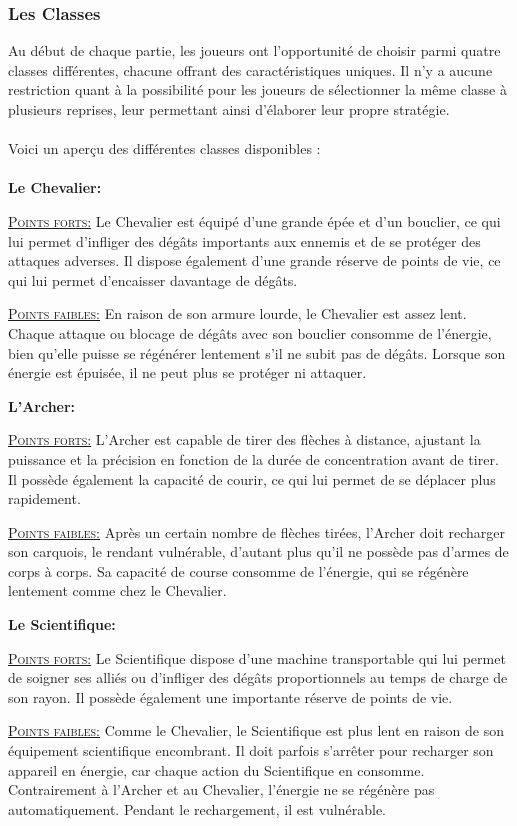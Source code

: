 \documentclass{article}
\begin{document}
\subsubsection{Les Classes}
Au début de chaque partie, les joueurs ont l'opportunité de choisir parmi quatre classes différentes, chacune offrant des caractéristiques uniques. Il n'y a aucune restriction quant à la possibilité pour les joueurs de sélectionner la même classe à plusieurs reprises, leur permettant ainsi d'élaborer leur propre stratégie.\\ \\
Voici un aperçu des différentes classes disponibles :\\ \\
\textbf{Le Chevalier:}
\begin{list}{}{\leftmargin 1cm} 
\item \textsc{\underline{Points forts:}}
Le Chevalier est équipé d'une grande épée et d'un bouclier, ce qui lui permet d'infliger des dégâts importants aux ennemis et de se protéger des attaques adverses. Il dispose également d'une grande réserve de points de vie, ce qui lui permet d'encaisser davantage de dégâts.
\item \textsc{\underline{Points faibles:}}
En raison de son armure lourde, le Chevalier est assez lent. Chaque attaque ou blocage de dégâts avec son bouclier consomme de l'énergie, bien qu'elle puisse se régénérer lentement s'il ne subit pas de dégâts. Lorsque son énergie est épuisée, il ne peut plus se protéger ni attaquer.
\end{list}
\textbf{L'Archer:}
\begin{list}{}{\leftmargin 1cm} 
\item \textsc{\underline{Points forts:}}
L'Archer est capable de tirer des flèches à distance, ajustant la puissance et la précision en fonction de la durée de concentration avant de tirer. Il possède également la capacité de courir, ce qui lui permet de se déplacer plus rapidement.
\item \textsc{\underline{Points faibles:}}
Après un certain nombre de flèches tirées, l'Archer doit recharger son carquois, le rendant vulnérable, d'autant plus qu'il ne possède pas d'armes de corps à corps. Sa capacité de course consomme de l'énergie, qui se régénère lentement comme chez le Chevalier.
\end{list}
\pagebreak
\textbf{Le Scientifique:}
\begin{list}{}{\leftmargin 1cm} 
\item \textsc{\underline{Points forts:}}
Le Scientifique dispose d'une machine transportable qui lui permet de soigner ses alliés ou d'infliger des dégâts proportionnels au temps de charge de son rayon. Il possède également une importante réserve de points de vie.
\item \textsc{\underline{Points faibles:}}
Comme le Chevalier, le Scientifique est plus lent en raison de son équipement scientifique encombrant. Il doit parfois s'arrêter pour recharger son appareil en énergie, car chaque action du Scientifique en consomme. Contrairement à l'Archer et au Chevalier, l'énergie ne se régénère pas automatiquement. Pendant le rechargement, il est vulnérable.
\end{list}
\end{document}
